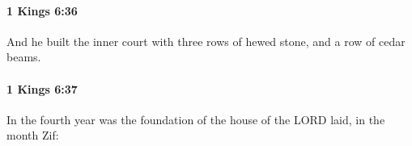 		\paragraph{1 Kings 6:36} %
			\label{1KINGS-6-36}

			And he built the inner court with three rows of hewed stone, and a row of cedar beams.


		\paragraph{1 Kings 6:37} %
			\label{1KINGS-6-37}

			In the fourth year was the foundation of the house of the LORD laid, in the month Zif:


